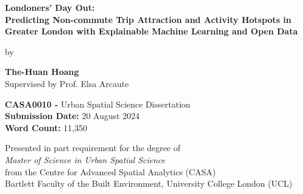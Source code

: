 
 \begin{titlepage}
    \begin{center}
        \vspace*{-3cm}
        
        \vfill %
        

        {\LARGE\textbf{Londoners' Day Out:\\Predicting Non-commute Trip Attraction and Activity Hotspots in Greater London with Explainable Machine Learning and Open Data\\}} 

        \vspace{2cm}
        by\\
        \vspace{1cm}
    
        \textbf{The-Huan Hoang\\}
        Supervised by Prof. Elsa Arcaute\\
            
        \vfill

        \textbf{CASA0010 -} Urban Spatial Science Dissertation\\
        \textbf{Submission Date:} 20 August 2024\\
        \textbf{Word Count:} 11,350\\

        \vspace{1cm}

        Presented in part requirement for the degree of\\
        \textit{Master of Science in Urban Spatial Science}\\ 
        from the Centre for Advanced Spatial Analytics (CASA)\\
        Bartlett Faculty of the Built Environment, University College London (UCL)\\
        
    
    \end{center}
\end{titlepage}
